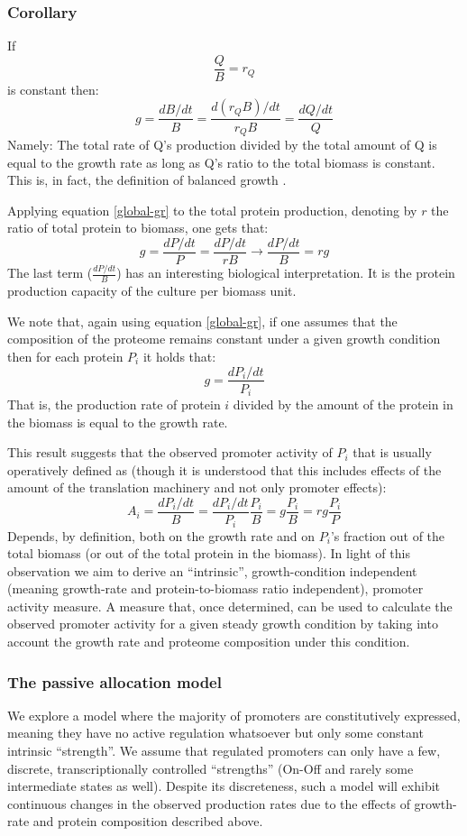 \documentclass{report}
\begin{document}
\subsubsection{Corollary}
If
\[\frac{Q}{B}=r_Q\]
is constant then:
\begin{equation}
\label{global-gr}
g=\frac{dB/dt}{B}=\frac{d(r_QB)/dt}{r_QB}=\frac{dQ/dt}{Q}
\end{equation}
Namely: The total rate of Q’s production divided by the total amount of Q is equal to the growth rate as long as Q’s ratio to the total biomass is constant.
This is, in fact, the definition of balanced growth \cite{Campbell1957}.

Applying equation \ref{global-gr} to the total protein production, denoting by $r$ the ratio of total protein to biomass, one gets that:
\[g=\frac{dP/dt}{P}=\frac{dP/dt}{rB}\rightarrow\frac{dP/dt}{B}=rg\]
The last term ($\frac{dP/dt}{B}$) has an interesting biological interpretation.
It is the protein production capacity of the culture per biomass unit.

We note that, again using equation \ref{global-gr}, if one assumes that the composition of the proteome remains constant under a given growth condition then for each protein $P_i$ it holds that:
\[g=\frac{dP_i/dt}{P_i}\]
That is, the production rate of protein $i$ divided by the amount of the protein in the biomass is equal to the growth rate.

This result suggests that the observed promoter activity of $P_i$ that is usually operatively defined as (though it is understood that this includes effects of the amount of the translation machinery and not only promoter effects):
\[A_i=\frac{dP_i/dt}{B}=\frac{dP_i/dt}{P_i}\frac{P_i}{B}=g\frac{P_i}{B}=rg\frac{P_i}{P}\]
Depends, by definition, both on the growth rate and on $P_i$’s fraction out of the total biomass (or out of the total protein in the biomass).
In light of this observation we aim to derive an “intrinsic”, growth-condition independent (meaning growth-rate and protein-to-biomass ratio independent), promoter activity measure.
A measure that, once determined, can be used to calculate the observed promoter activity for a given steady growth condition by taking into account the growth rate and proteome composition under this condition.
\subsubsection{The passive allocation model}
We explore a model where the majority of promoters are constitutively expressed, meaning they have no active regulation whatsoever but only some constant intrinsic “strength”.
We assume that regulated promoters can only have a few, discrete, transcriptionally controlled “strengths” (On-Off and rarely some intermediate states as well).
Despite its discreteness, such a model will exhibit continuous changes in the observed production rates due to the effects of growth-rate and protein composition described above.
\end{document}
